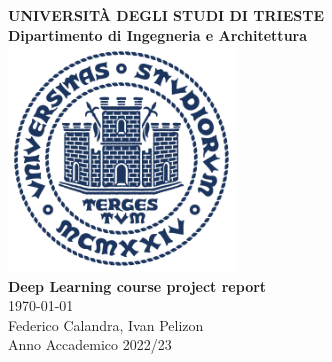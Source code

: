 
\begin{titlepage}
    \begin{center}
        {\LARGE {\bfseries UNIVERSIT\`A DEGLI STUDI DI TRIESTE \\}}
        \vspace{.5cm}
        {\Large {\bfseries Dipartimento di Ingegneria e Architettura \\}}
        \vspace{1cm}
        \includegraphics[width=6cm,height=6cm]{img/units_sigillo_pantone-534}\\[1.5cm]
        \vspace{1cm}
        {\LARGE
            {\bfseries Deep Learning course project report} \\
        }
        \vspace{1cm}
        {\large \today \\
        }
        \vfill
        Federico Calandra, Ivan Pelizon \\
        \vspace{.5cm}
        Anno Accademico 2022/23
    \end{center}
\end{titlepage}

